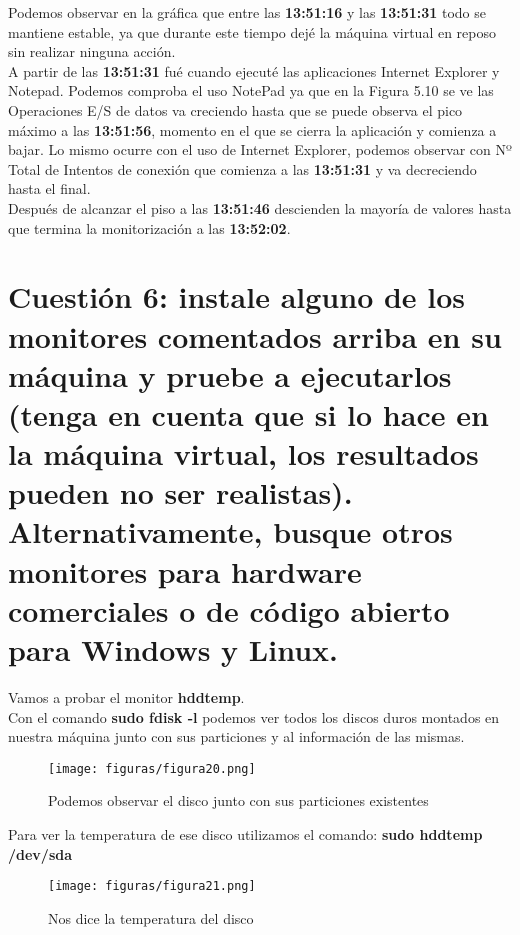Podemos observar en la gráfica que entre las \textbf{13:51:16} y las \textbf{13:51:31} todo se mantiene estable, ya que durante este tiempo dejé la máquina virtual en reposo sin realizar ninguna acción.\\
A partir de las \textbf{13:51:31} fué cuando ejecuté las aplicaciones Internet Explorer y Notepad. Podemos comproba el uso  NotePad ya que en la Figura 5.10 se ve las \textcolor{azuloscuro}{Operaciones E/S de datos} va creciendo hasta que se puede observa el pico máximo a las \textbf{13:51:56}, momento en el que se cierra la aplicación y comienza a bajar. Lo mismo ocurre con el uso de Internet Explorer, podemos observar con \textcolor{rosa}{Nº Total de Intentos de conexión} que comienza  a las \textbf{13:51:31} y va decreciendo hasta el final.\\
Después de alcanzar el piso a las \textbf{13:51:46} descienden la mayoría de valores hasta que termina la monitorización a las \textbf{13:52:02}. 

\section{Cuestión 6: instale alguno de los monitores comentados arriba en su máquina y pruebe a ejecutarlos (tenga en cuenta que si lo hace en la máquina virtual, los resultados pueden no ser realistas). Alternativamente, busque otros monitores para hardware comerciales o de código abierto para Windows y Linux.}
Vamos a probar el monitor 	\textbf{hddtemp}.\\
Con el comando \textbf{sudo fdisk -l} podemos ver todos los discos duros montados en nuestra máquina junto con sus particiones y al información de las mismas.

\begin{figure}[H] %
	\centering
	\texttt{[image: figuras/figura20.png]}  %
	\label{figura20}
	
	\caption{Podemos observar el disco junto con sus particiones existentes} 
\end{figure}

Para ver la temperatura de ese disco utilizamos el comando: \textbf{sudo hddtemp /dev/sda}

\begin{figure}[H] %
	\centering
	\texttt{[image: figuras/figura21.png]}  %
	\label{figura21}
	
	\caption{Nos dice la temperatura del disco} 
\end{figure}


